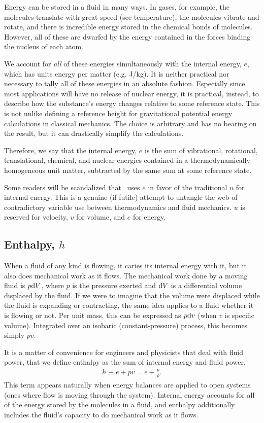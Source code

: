 Energy can be stored in a fluid in many ways.  In gases, for example, the molecules translate with great speed (see temperature), the molecules vibrate and rotate, and there is incredible energy stored in the chemical bonds of molecules.  However, all of these are dwarfed by the energy contained in the forces binding the nucleus of each atom.

We account for \emph{all} of these energies simultaneously with the internal energy, $e$, which has units energy per matter (e.g. J/kg).  It is neither practical nor necessary to tally all of these energies in an absolute fashion.  Especially since most applications will have no release of nuclear energy, it is practical, instead, to describe how the substance's energy changes relative to some reference state.  This is not unlike defining a reference height for gravitational potential energy calculations in classical mechanics.  The choice is arbitrary and has no bearing on the result, but it can drastically simplify the calculations.

Therefore, we say that the internal energy, $e$ is the sum of vibrational, rotational, translational, chemical, and nuclear energies contained in a thermodynamically homogeneous unit matter, subtracted by the same sum at some reference state.

Some readers will be scandalized that \PM\ uses $e$ in favor of the traditional $u$ for internal energy.  This is a genuine (if futile) attempt to untangle the web of contradictory variable use between thermodynamics and fluid mechanics.  $u$ is reserved for velocity, $v$ for volume, and $e$ for energy.

\subsection{Enthalpy, $h$}\label{sec:intro:h}

When a fluid of any kind is flowing, it caries its internal energy with it, but it also does mechanical work as it flows.  The mechanical work done by a moving fluid is $p \mathrm{d} V$, where $p$ is the pressure exerted and $\mathrm{d} V$ is a differential volume displaced by the fluid.  If we were to imagine that the volume were displaced while the fluid is expanding or contracting, the same idea applies to a fluid whether it is flowing or not.  Per unit mass, this can be expressed as $p \mathrm{d} v$ (when $v$ is specific volume).  Integrated over an isobaric (constant-pressure) process, this becomes simply $p v$.

It is a matter of convenience for engineers and physicists that deal with fluid power, that we define enthalpy as the sum of internal energy and fluid power,
\begin{align}
h \equiv e + pv = e + \frac{p}{\rho}.\label{eqn:intro:h}
\end{align}
This term appears naturally when energy balances are applied to open systems (ones where flow is moving through the system).  Internal energy accounts for all of the energy stored by the molecules in a fluid, and enthalpy additionally includes the fluid's capacity to do mechanical work as it flows.

